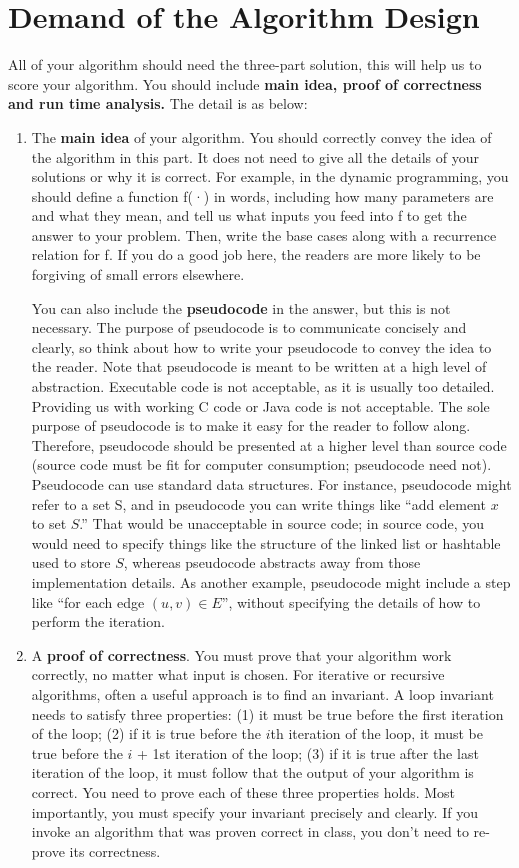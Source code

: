 \documentclass[10.5pt]{article}
\begin{document}
	\section*{Demand of the Algorithm Design}
All of your algorithm should need the three-part solution, this will help us to score your algorithm. You should include {\large\textbf{main idea,  proof of correctness and run time analysis.}} The detail is as below:
\begin{enumerate}

\item The {\textbf{main idea}} of your algorithm. You should correctly convey the idea of the algorithm in this part. It does not need to give all the details of your solutions or why it is correct. For example, in the dynamic programming, you should define a function f(·) in words, including how many parameters are and what they mean, and tell us what inputs you feed into f to get the answer to your problem. Then, write the base cases along with a recurrence relation for f. If you do a good job here, the readers are more likely to be forgiving of small errors elsewhere. 

You can also include the {\textbf{pseudocode}} in the answer, but this is not necessary. The purpose of pseudocode is to communicate concisely and clearly, so think about how to write your pseudocode to convey the idea to the
reader.
Note that pseudocode is meant to be written at a high level of abstraction. Executable code is
not acceptable, as it is usually too detailed. Providing us with working C code or Java code
is not acceptable. The sole purpose of pseudocode is to make it easy for the reader to follow
along. Therefore, pseudocode should be presented at a higher level than source code (source
code must be fit for computer consumption; pseudocode need not). Pseudocode can use
standard data structures. For instance, pseudocode might refer to a set S, and in pseudocode
you can write things like “add element $x$ to set $S$.” That would be unacceptable in source
code; in source code, you would need to specify things like the structure of the linked list
or hashtable used to store $S$, whereas pseudocode abstracts away from those implementation
details. As another example, pseudocode might include a step like “for each edge $(u, v) \in E$”,
without specifying the details of how to perform the iteration. 

\item A {\textbf{proof of correctness}}.  You must prove that your algorithm work correctly, no matter
what input is chosen.
For iterative or recursive algorithms, often a useful approach is to find an invariant. A loop
invariant needs to satisfy three properties: (1) it must be true before the first iteration of the
loop; (2) if it is true before the $i$th iteration of the loop, it must be true before the $i$ + 1st
iteration of the loop; (3) if it is true after the last iteration of the loop, it must follow that the output of your algorithm is correct. You need to prove each of these three properties holds.
Most importantly, you must specify your invariant precisely and clearly.
If you invoke an algorithm that was proven correct in class, you don’t need to re-prove its correctness.


\end{enumerate}
\end{document}
